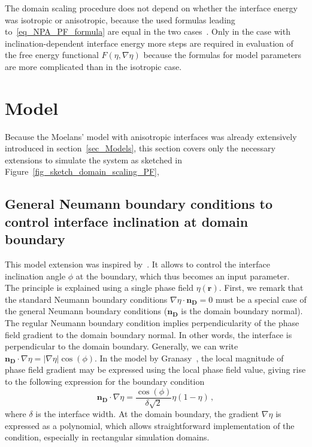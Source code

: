 The domain scaling procedure does not depend on whether the interface energy was isotropic or anisotropic, because the used formulas leading to~\eqref{eq_NPA_PF_formula} are equal in the two cases~\cite{Mariaux2011}. Only in the case with inclination-dependent interface energy more steps are required in evaluation of the free energy functional $F(\eta,\nabla\eta)$ because the formulas for model parameters are more complicated than in the isotropic case.

\section{Model}
Because the Moelans' model with anisotropic interfaces was already extensively introduced in section~\ref{sec_Models}, this section covers only the necessary extensions to simulate the system as sketched in Figure~\ref{fig_sketch_domain_scaling_PF}, 

	\subsection{General Neumann boundary conditions to control interface inclination at domain boundary}\label{sec_general_NBC_ch_NPA_PF}
	This model extension was inspired by~\cite{Granasy2007}. It allows to control the interface inclination angle $\phi$ at the boundary, which thus becomes an input parameter. The principle is explained using a single phase field $\eta(\bm{r})$. 
	First, we remark that the standard Neumann boundary conditions $\nabla\eta\cdot\bm{n_D}=0$ must be a special case of the general Neumann boundary conditions ($\bm{n_D}$ is the domain boundary normal). The regular Neumann boundary condition implies perpendicularity of the phase field gradient to the domain boundary normal. In other words, the interface is perpendicular to the domain boundary. Generally, we can write $\bm{n_D}\cdot \nabla\eta=|\nabla\eta|\cos(\phi)$. In the model by Granasy~\cite{Granasy2007}, the local magnitude of phase field gradient may be expressed using the local phase field value, giving rise to the following expression for the boundary condition
	\begin{equation}
		\bm{n_D}\cdot \nabla\eta=\frac{\cos(\phi)}{\delta\sqrt{2}}\eta(1-\eta)\,,
	\end{equation}
	where $\delta$ is the interface width. At the domain boundary, the gradient $\nabla\eta$ is expressed as a polynomial, which allows straightforward implementation of the condition, especially in rectangular simulation domains.
	
